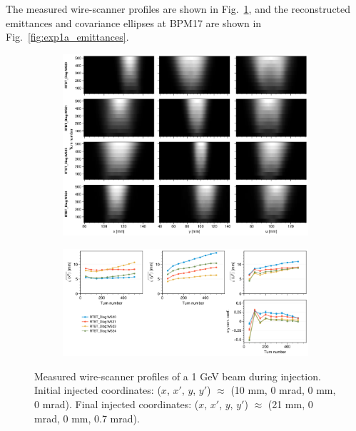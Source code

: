 The measured wire-scanner profiles are shown in Fig.~\ref{fig:exp1b_wsmeas}, and the reconstructed emittances and covariance ellipses at BPM17 are shown in Fig.~\ref{fig:exp1a_emittances}.
%
\begin{figure}[!p]
    \centering
    \begin{subfigure}{\textwidth}
        \includegraphics[width=\textwidth]{Images/chapter5/exp1b/waterfall.png}
    \end{subfigure}
    \vfill
    \vspace*{1.25cm}
    \vfill
    \begin{subfigure}{\textwidth}
        \includegraphics[width=\textwidth]{Images/chapter5/exp1b/rms.png}
    \end{subfigure}
    \caption{Measured wire-scanner profiles of a 1 GeV beam during injection. Initial injected coordinates: ($x$, $x'$, $y$, $y'$) $\approx$ (10 mm, 0 mrad, 0 mm, 0 mrad). Final injected coordinates: ($x$, $x'$, $y$, $y'$) $\approx$ (21 mm, 0 mrad, 0 mm, 0.7 mrad).}
    \label{fig:exp1b_wsmeas}
\end{figure}
